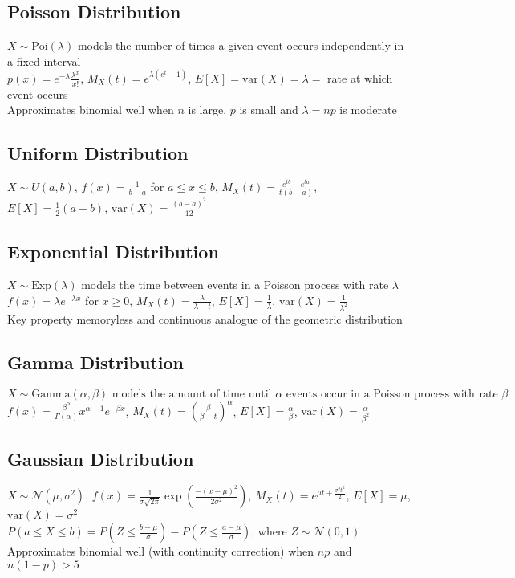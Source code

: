 \documentclass{article}
\newcommand{\V}{\mbox{var}}
\begin{document}
\subsection{Poisson Distribution}
$X\sim \mbox{Poi}(\lambda)$ models the number of times a given event occurs independently in a fixed interval \\
$p(x) = e^{-\lambda}\frac{\lambda^x}{x!}$, $M_X(t) = e^{\lambda(e^t - 1)}$, $E[X] = \V(X) = \lambda =$ rate at which event occurs \\
Approximates binomial well when $n$ is large, $p$ is small and $\lambda = np$ is moderate

\subsection{Uniform Distribution}
$X\sim U(a, b)$, $f(x) = \frac{1}{b-a}$ for $a \leq x \leq b$, $M_X(t) = \frac{e^{tb} - e^{ta}}{t(b-a)}$, $E[X] = \frac{1}{2}(a+b)$, $\V(X) = \frac{(b-a)^2}{12}$ 

\subsection{Exponential Distribution}
$X\sim \mbox{Exp}(\lambda)$ models the time between events in a Poisson process with rate $\lambda$ \\
$f(x) = \lambda e^{-\lambda x}$ for $x \geq 0$, $M_X(t) = \frac{\lambda}{\lambda - t}$, $E[X] = \frac{1}{\lambda}$, $\V(X) = \frac{1}{\lambda^2}$ \\
Key property memoryless and continuous analogue of the geometric distribution 

\subsection{Gamma Distribution}
$X \sim \mbox{Gamma}(\alpha, \beta)\mbox{ models the amount of time until }\alpha\mbox{ events occur in a Poisson process with rate }\beta$ \\
$f(x) = \frac{\beta ^\alpha}{\Gamma(\alpha)}x^{\alpha-1}e^{-\beta x}$, $M_X(t) = (\frac{\beta}{\beta - t})^\alpha$, $E[X] = \frac{\alpha}{\beta}$, $\V(X) = \frac{\alpha}{\beta ^2}$

\subsection{Gaussian Distribution}
$X\sim \mathcal{N}(\mu, \sigma^2)$, $f(x)=\frac{1}{\sigma \sqrt{2\pi}}\exp (\frac{-(x-\mu)^2}{2\sigma^2})$, $M_X(t) = e^{\mu t + \frac{\sigma^2 t^2}{2}}$, $E[X] = \mu$, $\V(X) = \sigma^2$ \\
$P(a\leq X \leq b) = P(Z \leq \frac{b-\mu}{\sigma}) - P(Z \leq \frac{a-\mu}{\sigma})$, where $Z \sim \mathcal{N}(0, 1)$ \\
Approximates binomial well (with continuity correction) when $np$ and $n(1-p) > 5$ 
\end{document}
